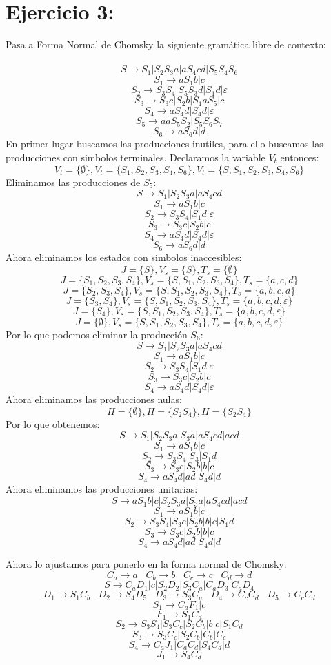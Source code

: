 \documentclass{article}
\begin{document}
\section*{Ejercicio 3:}
Pasa a Forma Normal de Chomsky la siguiente gramática libre de contexto:\\\\
$$S\rightarrow S_1 | S_2S_3a | aS_4cd | S_5S_4S_6$$
$$S_1 \rightarrow aS_1b | c$$
$$S_2\rightarrow S_3S_4 | S_5S_3d | S_1d | \varepsilon$$
$$S_3\rightarrow S_3c | S_2b | S_1aS_5 | c$$
$$S_4\rightarrow aS_4d | S_4d|\varepsilon$$
$$S_5\rightarrow aaS_5S_2 | S_5S_6S_7$$ 
$$S_6\rightarrow aS_6d | d$$
En primer lugar buscamos las producciones inutiles, para ello buscamos las producciones con simbolos terminales. Declaramos la variable $V_t$ entonces:
$$V_t=\{\emptyset\}, V_t=\{S_1,S_2,S_3,S_4,S_6\}, V_t=\{S,S_1,S_2,S_3,S_4,S_6\}$$
Eliminamos las producciones de $S_5$:
$$S\rightarrow S_1 | S_2S_3a | aS_4cd$$
$$S_1 \rightarrow aS_1b | c$$
$$S_2\rightarrow S_3S_4 | S_1d | \varepsilon$$
$$S_3\rightarrow S_3c | S_2b | c$$
$$S_4\rightarrow aS_4d | S_4d|\varepsilon$$ 
$$S_6\rightarrow aS_6d | d$$
Ahora eliminamos los estados con simbolos inaccesibles:
$$J=\{S\}, V_s=\{S\}, T_s=\{\emptyset\}$$
$$J=\{S_1,S_2,S_3,S_4\}, V_s=\{S,S_1,S_2,S_3,S_4\}, T_s=\{a,c,d\}$$
$$J=\{S_2,S_3,S_4\}, V_s=\{S,S_1,S_2,S_3,S_4\}, T_s=\{a,b,c,d\}$$
$$J=\{S_3,S_4\}, V_s=\{S,S_1,S_2,S_3,S_4\}, T_s=\{a,b,c,d,\varepsilon\}$$
$$J=\{S_4\}, V_s=\{S,S_1,S_2,S_3,S_4\}, T_s=\{a,b,c,d,\varepsilon\}$$
$$J=\{\emptyset\}, V_s=\{S,S_1,S_2,S_3,S_4\}, T_s=\{a,b,c,d,\varepsilon\}$$
Por lo que podemos eliminar la producción $S_6$:
$$S\rightarrow S_1 | S_2S_3a | aS_4cd$$
$$S_1 \rightarrow aS_1b | c$$
$$S_2\rightarrow S_3S_4 | S_1d | \varepsilon$$
$$S_3\rightarrow S_3c | S_2b | c$$
$$S_4\rightarrow aS_4d | S_4d|\varepsilon$$ 
Ahora eliminamos las producciones nulas:
$$H=\{\emptyset\}, H=\{S_2S_4\}, H=\{S_2S_4\}$$
Por lo que obtenemos:
$$S\rightarrow S_1 | S_2S_3a | S_3a | aS_4cd | acd$$
$$S_1 \rightarrow aS_1b | c$$
$$S_2\rightarrow S_3S_4 | S_3 | S_1d$$
$$S_3\rightarrow S_3c | S_2b | b | c$$
$$S_4\rightarrow aS_4d | ad |S_4d | d$$ 
Ahora eliminamos las producciones unitarias:
$$S\rightarrow aS_1b | c | S_2S_3a | S_3a | aS_4cd | acd$$
$$S_1 \rightarrow aS_1b | c$$
$$S_2\rightarrow S_3S_4 | S_3c | S_2b | b | c | S_1d$$
$$S_3\rightarrow S_3c | S_2b | b | c$$
$$S_4\rightarrow aS_4d | ad |S_4d | d$$

Ahora lo ajustamos para ponerlo en la forma normal de Chomsky:
$$C_a\rightarrow a\;\;\; C_b\rightarrow b\;\;\; C_c\rightarrow c\;\;\; C_d\rightarrow d$$
$$S\rightarrow C_aD_1 | c | S_2D_2 | S_3C_a | C_aD_3 | C_aD_4$$
$$D_1\rightarrow S_1C_b\;\;\; D_2\rightarrow S_4D_5\;\;\; D_3\rightarrow S_3C_a\;\;\; D_4\rightarrow C_cC_d\;\;\; D_5\rightarrow C_cC_d$$
$$S_1\rightarrow C_aF_1 | c$$
$$F_1\rightarrow S_1C_d$$
$$S_2\rightarrow S_3S_4 | S_3C_c | S_2C_b | b | c | S_1C_d$$
$$S_3\rightarrow S_3C_c | S_2C_b | C_b | C_c$$
$$S_4\rightarrow C_aJ_1 | C_aC_d | S_4C_d | d$$
$$J_1\rightarrow S_4C_d$$
\end{document}
